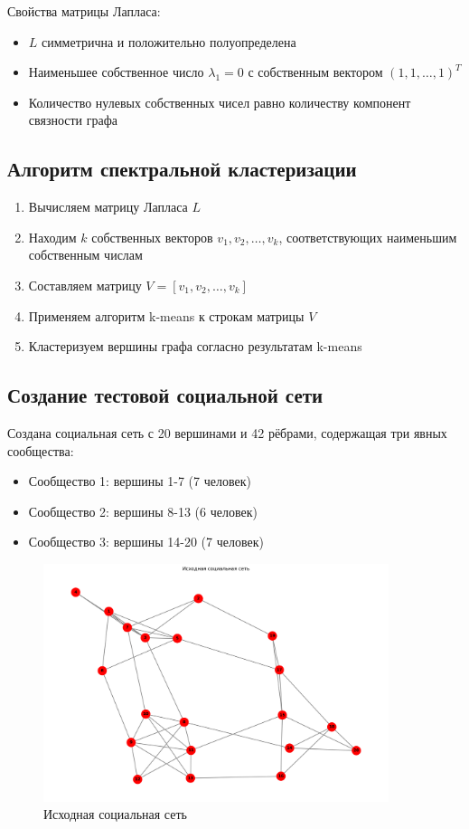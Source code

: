 Свойства матрицы Лапласа:
\begin{itemize}
    \item $L$ симметрична и положительно полуопределена
    \item Наименьшее собственное число $\lambda_1 = 0$ с собственным вектором $(1, 1, \ldots, 1)^T$
    \item Количество нулевых собственных чисел равно количеству компонент связности графа
\end{itemize}

\subsection*{Алгоритм спектральной кластеризации}

\begin{enumerate}
    \item Вычисляем матрицу Лапласа $L$
    \item Находим $k$ собственных векторов $v_1, v_2, \ldots, v_k$, соответствующих наименьшим собственным числам
    \item Составляем матрицу $V = [v_1, v_2, \ldots, v_k]$
    \item Применяем алгоритм k-means к строкам матрицы $V$
    \item Кластеризуем вершины графа согласно результатам k-means
\end{enumerate}

\subsection*{Создание тестовой социальной сети}

Создана социальная сеть с 20 вершинами и 42 рёбрами, содержащая три явных сообщества:

\begin{itemize}
    \item Сообщество 1: вершины 1-7 (7 человек)
    \item Сообщество 2: вершины 8-13 (6 человек)
    \item Сообщество 3: вершины 14-20 (7 человек)
\end{itemize}

\begin{figure}[H]
    \centering
    \includegraphics[width=0.9\textwidth]{images/task1/original_network.png}
    \caption{Исходная социальная сеть}
\end{figure}

